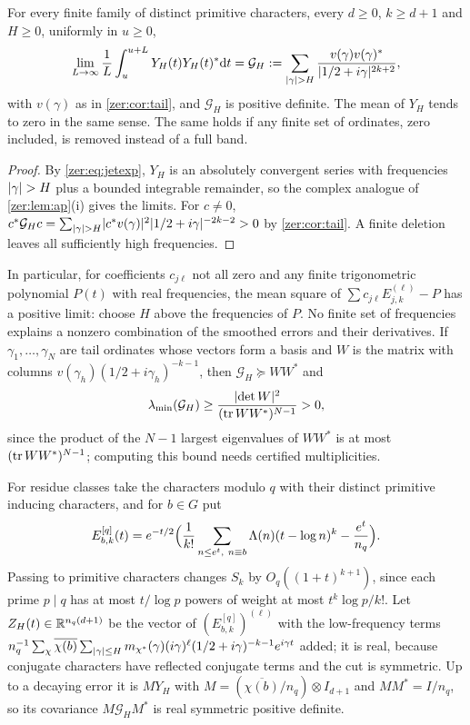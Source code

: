 \begin{theorem}\label{zer:thm:jets}
For every finite family of distinct primitive characters, every $d\ge0$, $k\ge d+1$ and
$H\ge0$, uniformly in $u\ge0$,
\[
 \lim_{L\to\infty}\frac1L\int_u^{u+L}Y_H(t)Y_H(t)^*\mathrm{d} t
 =\mathcal G_H:=\sum_{\lvert\gamma\rvert>H}\frac{v(\gamma)v(\gamma)^*}{\lvert1/2+i\gamma\rvert^{2k+2}},
\]
with $v(\gamma)$ as in \cref{zer:cor:tail}, and $\mathcal G_H$ is positive definite. The mean of
$Y_H$ tends to zero in the same sense. The same holds if any finite set of ordinates, zero
included, is removed instead of a full band.
\end{theorem}
\begin{proof}
By \eqref{zer:eq:jetexp}, $Y_H$ is an absolutely convergent series with frequencies $\lvert\gamma\rvert>H$
plus a bounded integrable remainder, so the complex analogue of \cref{zer:lem:ap}(i) gives the
limits. For $c\ne0$, $c^*\mathcal G_Hc=\sum_{\lvert\gamma\rvert>H}\lvert c^*v(\gamma)\rvert^2\lvert1/2+i\gamma\rvert^{-2k-2}>0$ by
\cref{zer:cor:tail}. A finite deletion leaves all sufficiently high frequencies.
\end{proof}

In particular, for coefficients $c_{j\ell}$ not all zero and any finite trigonometric polynomial
$P(t)$ with real frequencies, the mean square of $\sum c_{j\ell}E_{j,k}^{(\ell)}-P$ has a positive
limit: choose $H$ above the frequencies of $P$. No finite set of frequencies explains a
nonzero combination of the smoothed errors and their derivatives. If $\gamma_1,\dots,\gamma_N$
are tail ordinates whose vectors form a basis and $W$ is the matrix with columns
$v(\gamma_h)(1/2+i\gamma_h)^{-k-1}$, then $\mathcal G_H\succeq WW^*$ and
\begin{equation}\label{zer:eq:jetcert}
 \lambda_{\min}(\mathcal G_H)\ge\frac{\lvert\det W\rvert^2}{(\operatorname{tr} WW^*)^{N-1}}>0,
\end{equation}
since the product of the $N-1$ largest eigenvalues of $WW^*$ is at most $(\operatorname{tr} WW^*)^{N-1}$;
computing this bound needs certified multiplicities.

For residue classes take the characters modulo $q$ with their distinct primitive inducing
characters, and for $b\in G$ put
\[
 E^{[q]}_{b,k}(t)=e^{-t/2}\Bigl(\frac1{k!}\sum_{n\le e^t,\ n\equiv b}\Lambda(n)(t-\log n)^k-\frac{e^t}{n_q}\Bigr).
\]
Passing to primitive characters changes $S_k$ by $O_q((1+t)^{k+1})$, since each prime $p\mid q$
has at most $t/\log p$ powers of weight at most $t^k\log p/k!$. Let $Z_H(t)\in\mathbb{R}^{n_q(d+1)}$ be the
vector of $(E^{[q]}_{b,k})^{(\ell)}$ with the low-frequency terms
$n_q^{-1}\sum_\chi\overline{\chi(b)}\sum_{\lvert\gamma\rvert\le H}m_{\chi^*}(\gamma)(i\gamma)^\ell(1/2+i\gamma)^{-k-1}e^{i\gamma t}$
added; it is real, because conjugate characters have reflected conjugate terms and the cut is
symmetric. Up to a decaying error it is $MY_H$ with $M=(\overline{\chi(b)}/n_q)\otimes I_{d+1}$ and
$MM^*=I/n_q$, so its covariance $M\mathcal G_HM^*$ is real symmetric positive definite.

